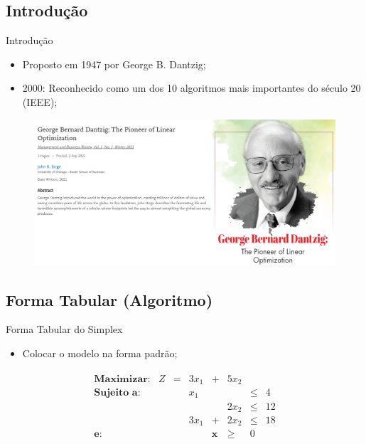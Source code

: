 \documentclass{if-beamer}
\begin{document}
\subsection{Introdução}
\begin{frame}{Introdução}
\begin{itemize}
    \item Proposto em 1947 por George B. Dantzig;
    \item 2000: Reconhecido como um dos 10 algoritmos mais importantes do século 20 (IEEE);
\end{itemize}
\begin{figure}
    \centering
    \includegraphics[scale=.3]{figuras/artigo_dantzig.png}
\end{figure}

\end{frame}


\subsection{Forma Tabular (Algoritmo)}
\begin{frame}{Forma Tabular do Simplex}

\begin{itemize}
    \item {} Colocar o modelo na forma padrão;
\end{itemize}

\begin{align*}
\begin{matrix}
    \textbf{Maximizar:} & Z & = & 3x_1 & + & 5x_2 & & \\
    \textbf{Sujeito a:} & & &  x_1 &   &      & \leq & 4  \\
                        & & &      &   & 2x_2 & \leq & 12 \\
                        & & & 3x_1 & + & 2x_2 & \leq & 18 \\
    \textbf{e:}         & & &      & \mathbf{x} & \geq & 0 & 
\end{matrix}    
\end{align*}

\end{frame}
\end{document}

